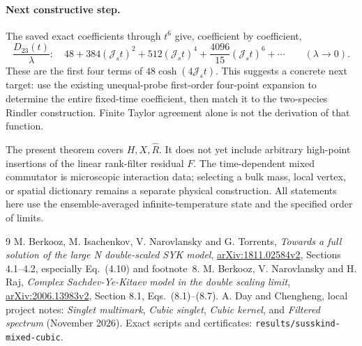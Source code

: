 \documentclass[11pt,a4paper]{article}
\newcommand{\Js}{\mathcal J_s}
\newcommand{\Rh}{\widehat R}
\begin{document}
\paragraph{Next constructive step.}
The saved exact coefficients through $t^6$ give, coefficient by coefficient,
\[
 \frac{D_{23}(t)}\lambda:
 \quad48+384(\Js t)^2+512(\Js t)^4+
                  \frac{4096}{15}(\Js t)^6+\cdots
 \qquad(\lambda\to0).
\]
These are the first four terms of $48\cosh(4\Js t)$. This suggests a
concrete next target: use the existing unequal-probe first-order
four-point expansion to determine the entire fixed-time coefficient,
then match it to the two-species Rindler construction. Finite Taylor
agreement alone is not the derivation of that function.

The present theorem covers $H,X,\Rh$. It does not yet include arbitrary
high-point insertions of the linear rank-filter residual $F$. The
time-dependent mixed commutator is microscopic interaction data; selecting
a bulk mass, local vertex, or spatial dictionary remains a separate
physical construction. All statements here use the ensemble-averaged
infinite-temperature state and the specified order of limits.

\begin{thebibliography}{9}
 M. Berkooz, M. Isachenkov, V. Narovlansky and G. Torrents,
\emph{Towards a full solution of the large N double-scaled SYK model},
\href{https://arxiv.org/abs/1811.02584}{arXiv:1811.02584v2},
Sections 4.1--4.2, especially Eq.~(4.10) and footnote~8.
 M. Berkooz, V. Narovlansky and H. Raj,
\emph{Complex Sachdev-Ye-Kitaev model in the double scaling limit},
\href{https://arxiv.org/abs/2006.13983}{arXiv:2006.13983v2},
Section 8.1, Eqs.~(8.1)--(8.7).
 A. Day and Chengheng, local project notes:
\emph{Singlet multimark}, \emph{Cubic singlet}, \emph{Cubic kernel},
and \emph{Filtered spectrum} (November 2026).
Exact scripts and certificates: \texttt{results/susskind-mixed-cubic}.
\end{thebibliography}
\end{document}
